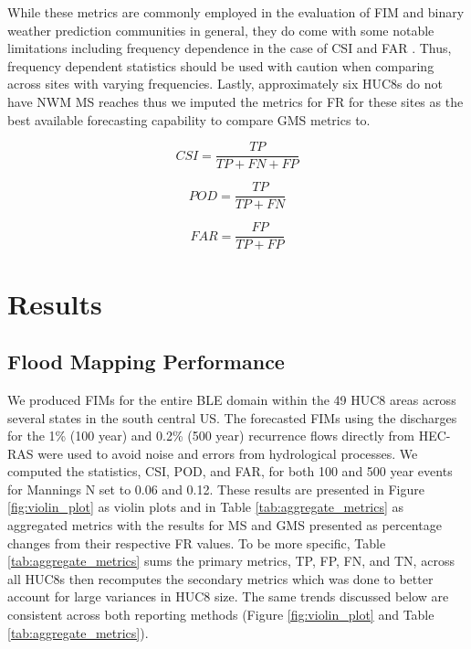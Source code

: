 \documentclass[draft]{dependencies/agujournal2019}
\begin{document}
While these metrics are commonly employed in the evaluation of FIM and binary weather prediction communities in general, they do come with some notable limitations including frequency dependence in the case of CSI and FAR \cite{gerapetritis2004behavior,stephens2014problems,schaefer1990critical,jolliffe2012forecast}.
Thus, frequency dependent statistics should be used with caution when comparing across sites with varying frequencies. 
Lastly, approximately six HUC8s do not have NWM MS reaches thus we imputed the metrics for FR for these sites as the best available forecasting capability to compare GMS metrics to.
%
\begin{linenomath*}
\begin{equation}
\label{eq:csi}
CSI = \frac{TP}{TP + FN + FP}
\end{equation}
\end{linenomath*}
%
\begin{linenomath*}
\begin{equation}
\label{eq:pod}
POD = \frac{TP}{TP + FN}
\end{equation}
\end{linenomath*}
%
\begin{linenomath*}
\begin{equation}
\label{eq:far}
FAR = \frac{FP}{TP + FP}
\end{equation}
\end{linenomath*}
%
\clearpage %
\section{Results}
\label{sec:results}
%
\subsection{Flood Mapping Performance}
\label{ssec:flood_mapping_performance}
%
We produced FIMs for the entire BLE domain within the 49 HUC8 areas across several states in the south central US. 
The forecasted FIMs using the discharges for the 1\% (100 year) and 0.2\% (500 year) recurrence flows directly from HEC-RAS were used to avoid noise and errors from hydrological processes.
We computed the statistics, CSI, POD, and FAR, for both 100 and 500 year events for Mannings N set to 0.06 and 0.12.
These results are presented in Figure \ref{fig:violin_plot} as violin plots and in Table \ref{tab:aggregate_metrics} as aggregated metrics with the results for MS and GMS presented as percentage changes from their respective FR values.
To be more specific, Table \ref{tab:aggregate_metrics} sums the primary metrics, TP, FP, FN, and TN, across all HUC8s then recomputes the secondary metrics which was done to better account for large variances in HUC8 size.
The same trends discussed below are consistent across both reporting methods (Figure \ref{fig:violin_plot} and Table \ref{tab:aggregate_metrics}).
\end{document}
